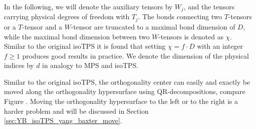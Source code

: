 In the following, we will denote the auxiliary tensors by $W_j$, and the tensors carrying physical degrees of freedom with $T_j$. The bonds connecting two $T$-tensors or a $T$-tensor and a $W$-tensor are truncated to a maximal bond dimension of $D$, while the maximal bond dimension between two $W$-tensors is denoted as $\chi$. Similar to the original isoTPS it is found that setting $\chi=f\cdot D$ with an integer $f\ge1$ produces good results in practice. We denote the dimension of the physical indices by $d$ in analogy to MPS and isoTPS. \par
Similar to the original isoTPS, the orthogonality center can easily and exactly be moved along the orthogonality hypersurface using QR-decompositions, compare Figure . Moving the orthogonality hypersurface to the left or to the right is a harder problem and will be discussed in Section \ref{sec:YB_isoTPS_yang_baxter_move}. \par
